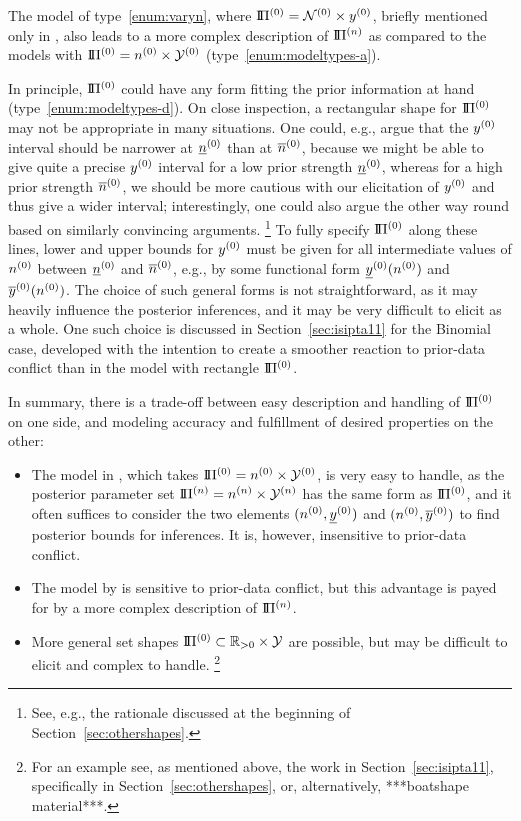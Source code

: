 The model of type~\eqref{enum:varyn}, where $\text{I}\!\Pi^{(0)} = \mathcal{N}^{(0)} \times y^{(0)}$,
briefly mentioned only in \textcite[footnote no.~10 in \S 1.1.4, and \S 7.8.3]{1991:walley},
also leads to a more complex description of $\text{I}\!\Pi^{(n)}$ as compared to the models with $\text{I}\!\Pi^{(0)} = n^{(0)} \times \mathcal{Y}^{(0)}$ (type~\eqref{enum:modeltypes-a}).

In principle, $\text{I}\!\Pi^{(0)}$ could have any form fitting the prior information at hand (type~\eqref{enum:modeltypes-d}).
On close inspection, a rectangular shape for $\text{I}\!\Pi^{(0)}$ may not be appropriate in many situations.
One could, e.g., argue that the $y^{(0)}$ interval should be narrower at $\underline{n}^{(0)}$ than at $\overline{n}^{(0)}$,
because we might be able to give quite a precise $y^{(0)}$ interval for a low prior strength $\underline{n}^{(0)}$,
whereas for a high prior strength $\overline{n}^{(0)}$, we should be more cautious with our elicitation of $y^{(0)}$ and thus give a wider interval;
interestingly, one could also argue the other way round based on similarly convincing arguments.%
\footnote{See, e.g., the rationale discussed at the beginning of Section~\ref{sec:othershapes}.}
To fully specify $\text{I}\!\Pi^{(0)}$ along these lines,
lower and upper bounds for $y^{(0)}$ must be given for all intermediate values of $n^{(0)}$ between $\underline{n}^{(0)}$ and $\overline{n}^{(0)}$,
e.g., by some functional form $\underline{y}^{(0)}(n^{(0)})$ and $\overline{y}^{(0)}(n^{(0)})$.
The choice of such general forms is not straightforward,
as it may heavily influence the posterior inferences,
and it may be very difficult to elicit as a whole.
One such choice is discussed in Section~\ref{sec:isipta11} \parencite{Walter2011a} for the Binomial case,
developed with the intention to create a smoother reaction to prior-data conflict than in the model with rectangle $\text{I}\!\Pi^{(0)}$.

In summary, there is a trade-off between easy description and handling of $\text{I}\!\Pi^{(0)}$ on one side,
and modeling accuracy and fulfillment of desired properties on the other:
\begin{itemize}%
\item The model in \textcite{2005:quaeghebeurcooman}, which takes $\text{I}\!\Pi^{(0)} = n^{(0)} \times \mathcal{Y}^{(0)}$, is very easy to handle,
as the posterior parameter set $\text{I}\!\Pi^{(n)} = n^{(n)} \times \mathcal{Y}^{(n)}$ has the same form as $\text{I}\!\Pi^{(0)}$,
and it often suffices to consider the two elements $(n^{(0)}, \underline{y}^{(0)})$ and $(n^{(0)}, \overline{y}^{(0)})$ to find posterior bounds for inferences.
It is, however, insensitive to prior-data conflict.
\item The model by \textcite{Walter2009a} is sensitive to prior-data conflict,
but this advantage is payed for by a more complex description of $\text{I}\!\Pi^{(n)}$.
\item More general set shapes $\text{I}\!\Pi^{(0)} \subset \mathbb{R}_{>0} \times \mathcal{Y}$ are possible,
but may be difficult to elicit and complex to handle.%
\footnote{For an example see, as mentioned above, the work in Section~\ref{sec:isipta11}, specifically in Section~\ref{sec:othershapes},
or, alternatively, ***boatshape material***.}
\end{itemize}

